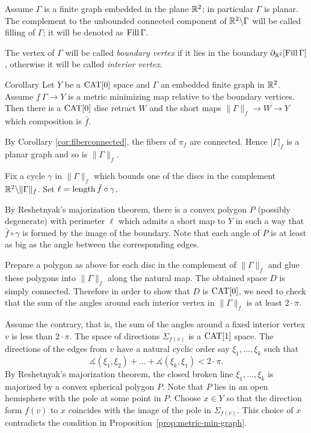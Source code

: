 \documentclass{article}
\begin{document}
Assume $\Gamma$ is a finite graph embedded in the plane $\mathbb{R}^2$;
in particular $\Gamma$ is planar.
The complement to the unbounded connected component of $\mathbb{R}^2\backslash\Gamma$ will be called filling of $\Gamma$;
it will be denoted as $\mathop{\rm Fill}\Gamma$.

The vertex of $\Gamma$ will be called \emph{boundary vertex}
if it lies in the boundary $\partial_{\mathbb{R}^2}[\mathop{\rm Fill}\Gamma]$,
otherwise it will be called \emph{interior vertex}.

\begin{thm}{Corollary}\label{cor:planar-minimizing-graph}
Let $Y$ be a $\mathop{\rm CAT}\nolimits[0]$ space and
$\Gamma$ an embedded finite graph in $\mathbb{R}^2$.
Assume $f\:\Gamma\to Y$ is a metric minimizing map relative to the boundary vertices. 
Then there is a $\mathop{\rm CAT}\nolimits[0]$ disc retract $W$
and the short maps $\|\Gamma\|_f\to W\to Y$ which composition is 
 $\bar f$.
\end{thm}


By Corollary \ref{cor:fiberconnected}, the fibers of $\pi_f$ are connected.
Hence $|\Gamma|_f$ is 
a planar graph and so is $\|\Gamma\|_f$.


Fix a cycle $\gamma$ in $\|\Gamma\|_f$ which bounds one of the discs in the complement $\mathbb{R}^2\backslash \|\Gamma\|_f$.
Set $\ell=\mathop{\rm length}\nolimits \bar f\circ\gamma$.

By Reshetnyak's majorization theorem, there is a convex polygon $P$ (possibly degenerate) with perimeter $\ell$ which admits 
a short map to $Y$ in such a way that $\bar f\circ\gamma$ is formed by the image of the boundary.
Note that each angle of $P$ is at least as big as 
the angle between the corresponding edges.

Prepare a polygon as above for each disc in the complement of $\|\Gamma\|_f$
and glue these polygons into $\|\Gamma\|_f$ along the natural map.
The obtained space $D$ is simply connected.
Therefore in order to show that $D$ is $\mathop{\rm CAT}\nolimits[0]$,
we need to check that the sum of the angles around each interior vertex in $\|\Gamma\|_f$ is at least $2\cdot\pi$.


Assume the contrary, that is, 
the sum of the angles around a fixed interior vertex $v$ is less than $2\cdot\pi$.
The space of directions $\Sigma_{f(v)}$ is a $\mathop{\rm CAT}\nolimits[1]$ space.
The directions of the edges from $v$ have a natural
cyclic order say $\xi_1,\dots,\xi_k$
such that
\[\measuredangle(\xi_1,\xi_2)+\dots+\measuredangle(\xi_k,\xi_1)<2\cdot\pi.\]
By Reshetnyak's majorization theorem,
the closed broken line $\xi_1,\dots,\xi_k$ is majorized by a convex spherical polygon $P$.
Note that $P$ lies in an open hemisphere with the pole  at some point in $P$.
Choose $x\in Y$ so that the direction form $f(v)$ to $x$ coincides with the image of the pole in $\Sigma_{f(v)}$.
This choice of $x$ contradicts the condition in Proposition~\ref{prop:metric-min-graph}.
\end{document}
